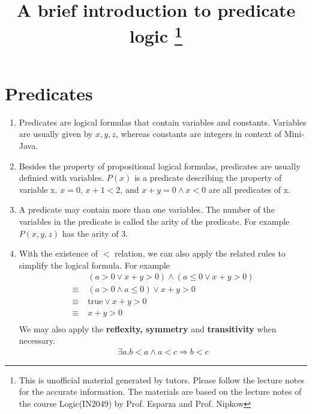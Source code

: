 \documentclass[12pt]{article}
\title{A brief introduction to predicate logic \footnote{This is unofficial material generated by tutors. 
Please follow the lecture notes for the accurate information. The materials are based on the lecture notes 
of the course Logic(IN2049) by Prof. Esparza and Prof. Nipkow}}
\begin{document}
\maketitle

\section*{Predicates}
\begin{enumerate}
    \item Predicates are logical formulas that contain variables and constants. Variables are usually given by $x, y, z$, whereas constants are integers in context of Mini-Java.
    \item Besides the property of propositional logical formulas, predicates are usually definied with variables.
    $P(x)$ is a predicate describing the property of variable x. $x = 0$, $x + 1 < 2$, and $x + y = 0 \land x < 0$ are all 
    predicates of x.
    \item A predicate may contain more than one variables. The number of the variables in the predicate is
    called the arity of the predicate. For example $P(x, y, z)$ has the arity of 3.
    \item With the existence of $<$ relation, we can also apply the related rules to simplify the logical formula. For example
    \begin{align*}
        &\; (a > 0 \lor x + y > 0) \land (a \leq 0 \lor x + y > 0)\\
        \equiv& \; (a > 0 \land a \leq 0) \lor x + y > 0\\
        \equiv& \; \text{true} \lor x + y > 0\\
        \equiv& \; x + y > 0\\
    \end{align*}
    We may also apply the \textbf{reflexity, symmetry} and \textbf{transitivity} when necessary.
    \begin{align*}
        \exists a. b < a \land a < c \Longrightarrow b < c
    \end{align*}
\end{enumerate}
\end{document}

